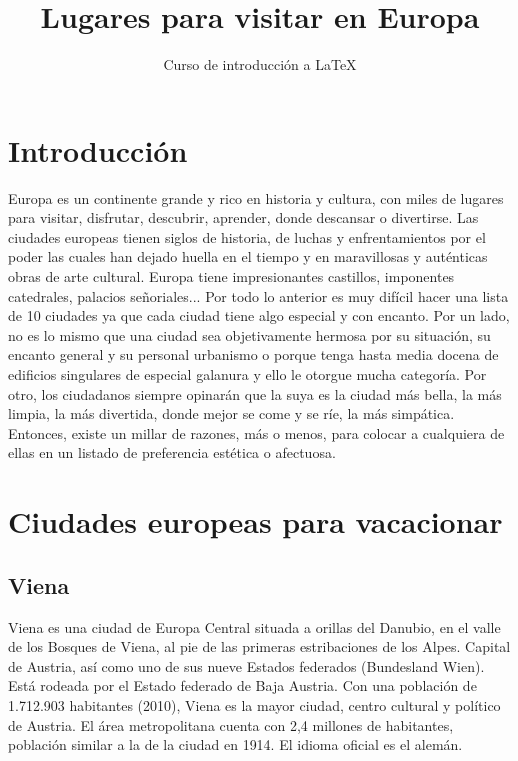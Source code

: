 \documentclass[10pt,letterpaper,oneside]{book}
\title{Lugares para visitar en Europa}
\author{Curso de introducción a LaTeX}
\begin{document}
\frontmatter

\maketitle
\tableofcontents

\chapter{Introducción}
Europa es un continente grande y rico en historia y cultura, con miles de lugares para visitar, disfrutar, descubrir, aprender, donde descansar o divertirse. Las ciudades europeas tienen siglos de historia, de luchas y enfrentamientos por el poder las cuales han dejado huella en el tiempo y en maravillosas y auténticas obras de arte cultural. Europa tiene impresionantes castillos, imponentes catedrales, palacios señoriales... Por todo lo anterior es muy difícil hacer una lista de 10 ciudades ya que cada ciudad tiene algo especial y con encanto. Por un lado, no es lo mismo que una ciudad sea objetivamente hermosa por su situación, su encanto general y su personal urbanismo o porque tenga hasta media docena de edificios singulares de especial galanura y ello le otorgue mucha categoría. Por otro, los ciudadanos siempre opinarán que la suya es la ciudad más bella, la más limpia, la más divertida, donde mejor se come y se ríe, la más simpática. Entonces, existe un millar de razones, más o menos, para colocar a cualquiera de ellas en un listado de preferencia estética o afectuosa.

\mainmatter
    \chapter{Ciudades europeas para vacacionar}
        \section{Viena}
            Viena es una ciudad de Europa Central situada a orillas 
            del Danubio, en el valle de los Bosques de Viena, al 
            pie de las primeras estribaciones de los Alpes. Capital 
            de Austria, así como uno de sus nueve Estados federados
            (Bundesland Wien).\\
 
            Está rodeada por el Estado federado de Baja Austria. 
            Con una población de 1.712.903 habitantes (2010),
            Viena es la mayor ciudad, centro cultural y político 
            de Austria. El área metropolitana cuenta con 2,4 
            millones de habitantes, población similar a la de la 
            ciudad en 1914. El idioma oficial es el alemán.\\
 
\end{document}
